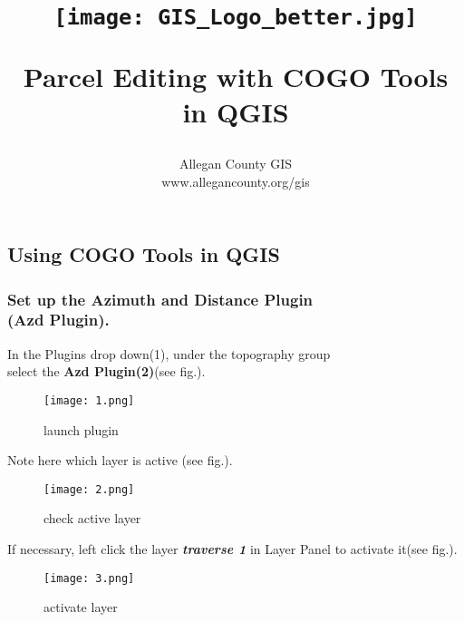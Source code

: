 \documentclass[class=book , crop=false]{standalone}
\title{ %
\HRule %
\\[.4cm] %
\begin{figure}[H] %
\begin{center}	%
\texttt{[image: GIS\_Logo\_better.jpg]}
\end{center}
\end{figure}
\Huge \bfseries Parcel Editing with COGO Tools in QGIS %
\HRule \\[.4cm] %
}  %
\author{\Large Allegan County GIS \\\Large www.allegancounty.org/gis} %
\begin{document}

\ifstandalone
\maketitle %
\tableofcontents %
\clearpage
\fi

\subsection{Using COGO Tools in QGIS}
\medskip 
\subsubsection{\Large Set up the Azimuth and Distance Plugin \\\small(Azd Plugin).}
\medskip
\large In the Plugins drop down(1), \large under the topography group\\\Large select the \textbf {Azd Plugin(2)}(see fig.).
\begin{figure}[H] %
\begin{center}
\texttt{[image: 1.png]}
\end{center}
\caption{launch plugin}
\end{figure}
\clearpage
		
\large Note here which layer is active (see fig.).
\begin{figure}[H] %
\begin{center}
\texttt{[image: 2.png]}
\end{center}
\caption{check active layer}
\end{figure}


If necessary, left click the layer \textbf {\emph{traverse 1}} in Layer Panel to activate it(see fig.).
\begin{figure}[H] %
\begin{center}
\texttt{[image: 3.png]}
\end{center}
\caption{activate layer}
\end{figure}

\clearpage
\end{document}
